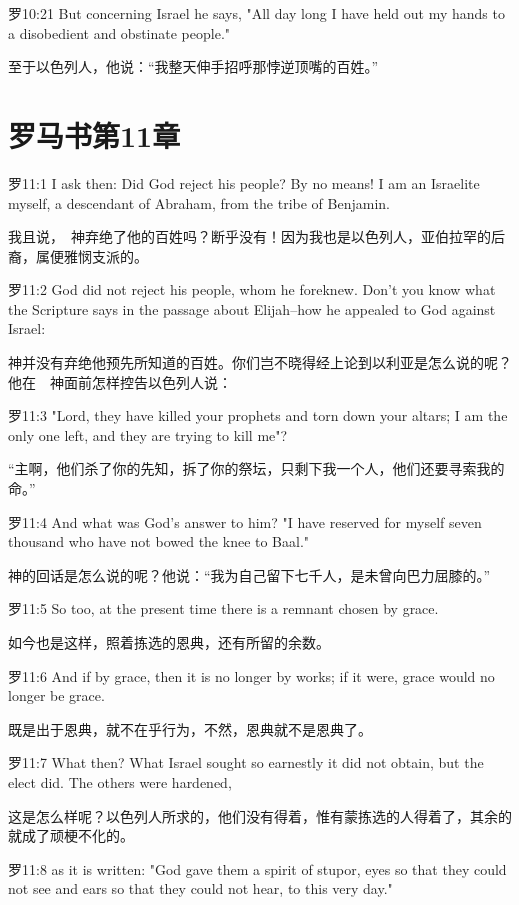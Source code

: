 \documentclass[a4paper,11pt,onecolumn,twoside]{ctexart}
\begin{document}
\begin{multicols}{2}
 罗10:21
 But concerning Israel he says, "All day long I have held out my hands to a disobedient and obstinate people."

 至于以色列人，他说：“我整天伸手招呼那悖逆顶嘴的百姓。”


 \section{罗马书第11章}
 罗11:1
 I ask then: Did God reject his people? By no means! I am an Israelite myself, a descendant of Abraham, from the tribe of Benjamin.

 我且说，　神弃绝了他的百姓吗？断乎没有！因为我也是以色列人，亚伯拉罕的后裔，属便雅悯支派的。


 罗11:2
 God did not reject his people, whom he foreknew. Don't you know what the Scripture says in the passage about Elijah--how he appealed to God against Israel:

 神并没有弃绝他预先所知道的百姓。你们岂不晓得经上论到以利亚是怎么说的呢？他在　神面前怎样控告以色列人说：


 罗11:3
 "Lord, they have killed your prophets and torn down your altars; I am the only one left, and they are trying to kill me"?

 “主啊，他们杀了你的先知，拆了你的祭坛，只剩下我一个人，他们还要寻索我的命。”


 罗11:4
 And what was God's answer to him? "I have reserved for myself seven thousand who have not bowed the knee to Baal."

 神的回话是怎么说的呢？他说：“我为自己留下七千人，是未曾向巴力屈膝的。”


 罗11:5
 So too, at the present time there is a remnant chosen by grace.

 如今也是这样，照着拣选的恩典，还有所留的余数。


 罗11:6
 And if by grace, then it is no longer by works; if it were, grace would no longer be grace.

 既是出于恩典，就不在乎行为，不然，恩典就不是恩典了。


 罗11:7
 What then? What Israel sought so earnestly it did not obtain, but the elect did. The others were hardened,

 这是怎么样呢？以色列人所求的，他们没有得着，惟有蒙拣选的人得着了，其余的就成了顽梗不化的。


 罗11:8
 as it is written: "God gave them a spirit of stupor, eyes so that they could not see and ears so that they could not hear, to this very day."


\end{multicols}
\end{document}
